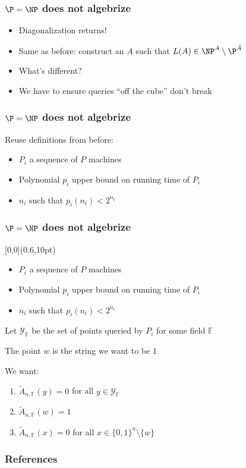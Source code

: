 \documentclass[xcolor={usenames,dvipsnames}]{beamer}
\begin{document}
\begin{frame}
  \frametitle{$\P = \NP$ does not algebrize}
  \begin{itemize}
    \item Diagonalization returns!
    \item Same as before: construct an $A$ such that $L(A) \in \NP^{A} \setminus \P^{\tilde{A}}$
    \item What's different?
    \item We have to ensure queries ``off the cube'' don't break
  \end{itemize}
\end{frame}

\begin{frame}
  \frametitle{$\P = \NP$ does not algebrize}
  Reuse definitions from before:

  \begin{itemize}
    \item $P_{i}$ a sequence of $P$ machines
    \item Polynomial $p_{i}$ upper bound on running time of $P_{i}$
    \item $n_{i}$ such that $p_{i}(n_{i}) < 2^{n_{i}}$
  \end{itemize}
\end{frame}

\begin{frame}
  \frametitle{$\P = \NP$ does not algebrize}
  \begin{textblock*}{\paperwidth}[0,0](0.6\textwidth,10pt)
    \tiny
    \begin{itemize}
      \item $P_{i}$ a sequence of $P$ machines
      \item Polynomial $p_{i}$ upper bound on running time of $P_{i}$
      \item $n_{i}$ such that $p_{i}(n_{i}) < 2^{n_{i}}$
    \end{itemize}
  \end{textblock*}

  Let $\mathcal{Y}_{\mathbb{F}}$ be the set of points queried by $P_{i}$ for some field
  $\mathbb{F}$

  \bigskip
  The point $w$ is the string we want to be $1$

  \bigskip
  We want:
  \begin{enumerate}
    \item $\tilde{A}_{n,\mathbb{F}}(y) = 0$ for all $y \in \mathcal{Y}_{\mathbb{F}}$
    \item $\tilde{A}_{n,\mathbb{F}}(w) = 1$
    \item $\tilde{A}_{n,\mathbb{F}}(x) = 0$ for all $x \in \{0, 1\}^{n} \setminus \{w\}$
  \end{enumerate}
\end{frame}

\begin{frame}
  \frametitle{References}

  \nocite{AW09}
  \printbibliography{}
\end{frame}
\end{document}
